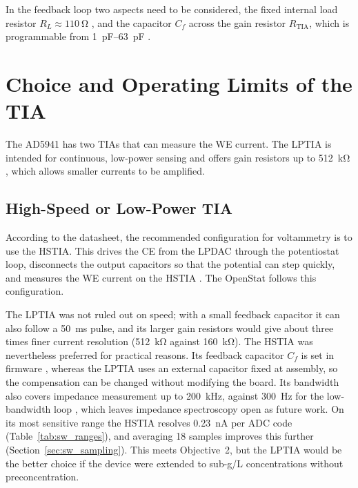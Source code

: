 In the feedback loop two aspects need to be considered, the fixed internal load resistor $R_L \approx \SI{110}{\ohm}$ \cite[pp.~10, 50]{ad5941_ds}, and the capacitor $C_f$ across the gain resistor $R_\mathrm{TIA}$, which is programmable from \SIrange{1}{63}{\pico\farad} \cite[p.~52]{ad5941_ds}. 

\section{Choice and Operating Limits of the TIA}
\label{sec:tia_choice}

The AD5941 has two TIAs that can measure the WE current. The LPTIA is
intended for continuous, low-power sensing and offers gain resistors up to \SI{512}{\kilo\ohm} \cite[p.~10]{ad5941_ds},
which allows smaller currents to be amplified. 

\subsection{High-Speed or Low-Power TIA}
\label{sec:hstia_lptia}

According to the datasheet, the recommended configuration for voltammetry is to use the HSTIA. This drives the CE from the LPDAC through the potentiostat loop,
disconnects the output capacitors so that the potential can
step quickly, and measures the WE current on the HSTIA
\cite[Table~21, p.~38]{ad5941_ds}. The OpenStat follows this configuration.

The LPTIA was not ruled out on speed; with a small feedback capacitor it can
also follow a \SI{50}{\milli\second} pulse, and its larger gain resistors would give about three times finer current resolution (\SI{512}{\kilo\ohm} against \SI{160}{\kilo\ohm}). The HSTIA was nevertheless preferred for practical reasons. Its
feedback capacitor $C_f$ is set in firmware \cite[p.~52]{ad5941_ds}, whereas
the LPTIA uses an external capacitor fixed at assembly, so the compensation
can be changed without modifying the board. Its bandwidth also covers
impedance measurement up to \SI{200}{\kilo\hertz}, against
\SI{300}{\hertz} for the low-bandwidth loop \cite[p.~9]{ad5941_ds}, which
leaves impedance spectroscopy open as future work. On its most sensitive range the HSTIA resolves \SI{0.23}{\nano\ampere} per ADC code (Table~\ref{tab:sw_ranges}), and averaging 18 samples improves this further (Section~\ref{sec:sw_sampling}). This meets Objective~2, but the LPTIA would be the better choice if the device were extended to sub-\textmu g/L concentrations without preconcentration.

